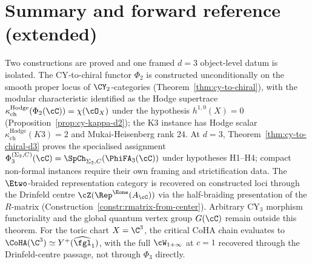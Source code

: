 \section{Summary and forward reference (extended)}
\label{sec:cy-to-chiral-closing-extended}

Two constructions are proved and one framed $d = 3$ object-level datum is isolated. The CY-to-chiral functor $\Phi_2$ is constructed unconditionally on the smooth proper locus of $\CY_2$-categories \textup{(}Theorem~\ref{thm:cy-to-chiral}\textup{),} with the modular characteristic identified as the Hodge supertrace $\kappa_{\mathrm{ch}}^{\mathrm{Hodge}}(\Phi_2(\cC)) = \chi(\cO_X)$ under the hypothesis $h^{1,0}(X) = 0$ \textup{(}Proposition~\ref{prop:cy-kappa-d2}\textup{);} the K3 instance has Hodge scalar $\kappa_{\mathrm{ch}}^{\mathrm{Hodge}}(K3) = 2$ and Mukai-Heisenberg rank $24$. At $d = 3$, Theorem~\ref{thm:cy-to-chiral-d3} proves the specialised assignment $\Phi_3^{(\Sigma_2,C)}(\cC)=\SpCh_{\Sigma_2,C}(\PhiFA_3(\cC))$ under hypotheses \textup{H1--H4}; compact non-formal instances require their own framing and strictification data. The $\Etwo$-braided representation category is recovered on constructed loci through the Drinfeld centre $\cZ(\Rep^{\Eone}(A_\cC))$ via the half-braiding presentation of the $R$-matrix \textup{(}Construction~\ref{constr:rmatrix-from-center}\textup{).} Arbitrary CY$_3$ morphism functoriality and the global quantum vertex group $G(\cC)$ remain outside this theorem. For the toric chart $X=\C^3$, the critical CoHA chain evaluates to $\CoHA(\C^3) \simeq Y^+(\widehat{\fgl}_1)$, with the full $\cW_{1+\infty}$ at $c = 1$ recovered through the Drinfeld-centre passage, not through $\Phi_3$ directly.

